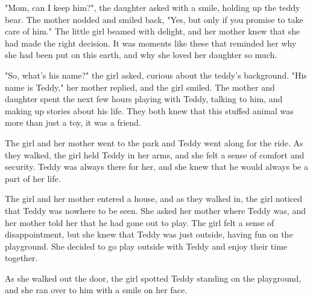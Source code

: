 \documentclass[smalldemyvopaper,11pt,twoside,onecolumn,openright,extrafontsizes]{memoir}
\begin{document}
"Mom, can I keep him?", the daughter asked with a smile, holding up the teddy bear. The mother nodded and smiled back, "Yes, but only if you promise to take care of him." The little girl beamed with delight, and her mother knew that she had made the right decision. It was moments like these that reminded her why she had been put on this earth, and why she loved her daughter so much.\par
"So, what's his name?" the girl asked, curious about the teddy's background. "His name is Teddy," her mother replied, and the girl smiled. The mother and daughter spent the next few hours playing with Teddy, talking to him, and making up stories about his life. They both knew that this stuffed animal was more than just a toy, it was a friend.\par
The girl and her mother went to the park and Teddy went along for the ride. As they walked, the girl held Teddy in her arms, and she felt a sense of comfort and security. Teddy was always there for her, and she knew that he would always be a part of her life.\par
The girl and her mother entered a house, and as they walked in, the girl noticed that Teddy was nowhere to be seen. She asked her mother where Teddy was, and her mother told her that he had gone out to play. The girl felt a sense of disappointment, but she knew that Teddy was just outside, having fun on the playground. She decided to go play outside with Teddy and enjoy their time together.\par
As she walked out the door, the girl spotted Teddy standing on the playground, and she ran over to him with a smile on her face.\par
\end{document}
